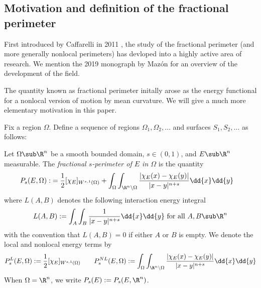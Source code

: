 \documentclass[../main.tex]{subfiles}
\begin{document}
\subsection{Motivation and definition of the fractional perimeter}


First introduced by Caffarelli in 2011 \cite{caffarelli:nonlocal, caffarelli:limit}, the study of the fractional perimeter (and more generally nonlocal perimeters) has devloped into a highly active area of research. We mention the 2019 monograph by Maz\'on \cite{mazon:nonlocal} for an overview of the development of the field. 

The quantity known as fractional perimeter initally arose as the energy functional for a nonlocal version of motion by mean curvature. We will give a much more elementary motivation in this paper.

Fix a region $ \Omega $. Define a sequence of regions $ \Omega_{1}, \Omega_{2},\ldots $ and surfaces $ S_{1},S_{2}, \ldots $ as follows: 
\begin{center}
    
\end{center}


\begin{definition}\label{fracperim}
    Let $ \Omega\sub \R^{n} $ be a smooth bounded domain, $ s\in (0,1) $, and $ E\sub \R^{n} $ measurable. The \textit{fractional $ s $-perimeter of $ E $ in $ \Omega $} is the quantity
    \begin{align*}
        P_{s}(E, \Omega) :&= \frac{1}{2}[\chi_{E}]_{W^{s,1}(\Omega)} + \int_{\Omega}\int_{\R^{n}\setminus \Omega} \frac{| \chi_{E}(x) - \chi_{E}(y)|}{|x-y|^{n+s}}\dd{x}\dd{y} 
    \end{align*}
    where $ L(A,B) $ denotes the following interaction energy integral
    \[
        L(A,B) := \int_{A}\int_{B}\frac{1}{|x-y|^{n+s}}\dd{x}\dd{y} \text{ for all } A,B\sub \R^{n}
    \]
    with the convention that $ L(A,B) = 0 $ if either $ A $ or $ B $ is empty. We denote the local and nonlocal energy terms by
    \[
        P_{s}^{L}(E,\Omega) := \frac{1}{2}[\chi_{E}]_{W^{s,1}(\Omega)} \quad \quad P_{s}^{NL}(E,\Omega) := \int_{\Omega}\int_{\R^{n}\setminus \Omega} \frac{| \chi_{E}(x) - \chi_{E}(y)|}{|x-y|^{n+s}}\dd{x}\dd{y} 
    \]
    When $ \Omega =\R^{n} $, we write $ P_{s}(E):= P_{s}(E,\R^{n}) $.
\end{definition}
\end{document}
